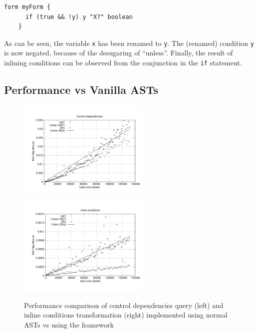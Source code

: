   \begin{lstlisting}[language=ql]
    form myForm {
      if (true && !y) y "X?" boolean
    }
  \end{lstlisting}

  As can be seen, the variable \lstinline{x} has been renamed to \lstinline{y}.
The (renamed) condition \lstinline{y} is now negated, because of the desugaring of ``unless''.
Finally, the result of inlining conditions can be observed from the conjunction in the \lstinline[language=ql]{if} statement.


\subsection{\name Performance vs Vanilla ASTs}

\begin{figure}[t]
  \nocaptionrule
  \hspace*{-.1\textwidth}
  \includegraphics[width=0.56\textwidth]{plots/controldeps}
  \hspace*{-.1\textwidth}
  \includegraphics[width=0.56\textwidth]{plots/inline}
  \caption{Performance comparison of control dependencies query (left) and inline conditions transformation (right) implemented using normal ASTs vs using the \name framework\label{FIG:performance}}
\end{figure}

